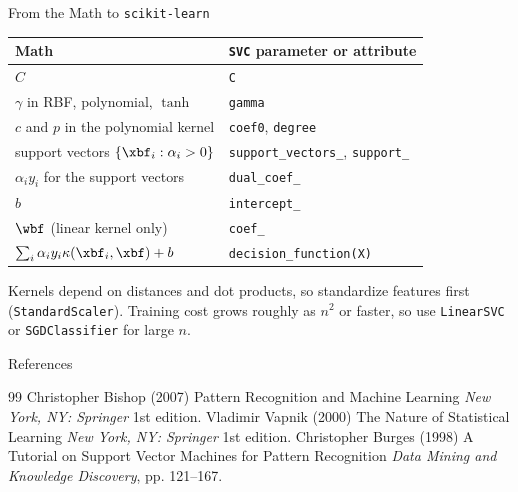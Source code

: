 \documentclass[aspectratio=169,xcolor=dvipsnames,svgnames,x11names,fleqn]{beamer}
\begin{document}
\begin{frame}{From the Math to \texttt{scikit-learn}}
    \begin{center}
    \small
    \begin{tabular}{ll}
        \toprule
        Math & \texttt{SVC} parameter or attribute \\
        \midrule
        $C$ & \texttt{C} \\
        $\gamma$ in RBF, polynomial, $\tanh$ & \texttt{gamma} \\
        $c$ and $p$ in the polynomial kernel & \texttt{coef0}, \texttt{degree} \\
        support vectors $\{\xbf_i : \alpha_i > 0\}$ & \texttt{support\_vectors\_}, \texttt{support\_} \\
        $\alpha_i y_i$ for the support vectors & \texttt{dual\_coef\_} \\
        $b$ & \texttt{intercept\_} \\
        $\wbf$ (linear kernel only) & \texttt{coef\_} \\
        $\sum_i \alpha_i y_i \kappa(\xbf_i, \xbf) + b$ & \texttt{decision\_function(X)} \\
        \bottomrule
    \end{tabular}
    \end{center}
    Kernels depend on distances and dot products, so standardize features first (\texttt{StandardScaler}). Training cost grows roughly as $n^2$ or faster, so use \texttt{LinearSVC} or \texttt{SGDClassifier} for large $n$.
\end{frame}


    
    
\begin{frame}{References}
    \footnotesize{
        \begin{thebibliography}{99}
             Christopher Bishop (2007)
            \newblock Pattern Recognition and Machine Learning
            \newblock \emph{New York, NY: Springer} 1st edition.
             Vladimir Vapnik (2000)
            \newblock The Nature of Statistical Learning
            \newblock \emph{New York, NY: Springer} 1st edition.
             Christopher Burges (1998)
            \newblock A Tutorial on Support Vector Machines for Pattern Recognition
            \newblock \emph{Data Mining and Knowledge Discovery}, pp. 121--167.
        \end{thebibliography}
    }
\end{frame}
    
\end{document}
